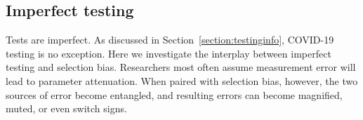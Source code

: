 \documentclass[11pt]{amsart}
\numberwithin{equation}{section}
\theoremstyle{plain}
\def\I{\bf I}
\begin{document}

\subsection{Imperfect testing}
\label{section:imperfecttesting}

Tests are imperfect.  As discussed in Section~\ref{section:testinginfo}, COVID-19 testing is no exception. Here we investigate the interplay between imperfect testing and selection bias.  Researchers most often assume measurement error will lead to parameter attenuation.  When paired with selection bias, however, the two sources of error become entangled, and resulting errors can become magnified, muted, or even switch signs.
\end{document}

